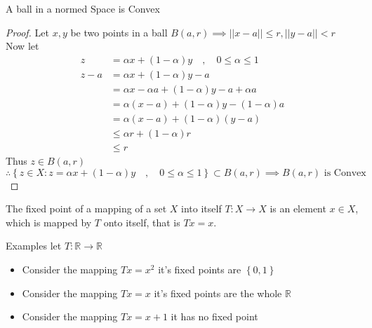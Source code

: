 \begin{definition}
\begin{center}
    \end{center}
\end{definition}
\begin{lemma}[]
    A ball in a normed Space is Convex
\end{lemma}
\begin{proof}[Proof]
    Let $x,y$ be two points in a ball $B(a,r) \implies ||x-a|| \leq r , ||y-a||<r$
    \\
    Now let 
    \begin{align*}
        z &= \alpha x + (1-\alpha)y \quad,\quad 0 \leq \alpha \leq 1
        \\
        z-a &= \alpha x + (1-\alpha)y-a
        \\
        &= \alpha x -\alpha a  + (1-\alpha)y-a + \alpha a 
        \\
        &= \alpha (x-a) + (1-\alpha)y-(1-\alpha)a
        \\
        &= \alpha (x-a) + (1-\alpha)(y-a)
        \\
        &\leq \alpha r + (1-\alpha)r
        \\
        &\leq r
    \end{align*}
    Thus $z \in B(a,r)$
    \[
        \therefore \left\{ z \in X : z = \alpha x + (1-\alpha)y \quad,\quad 0 \leq \alpha \leq 1 \right\} \subset B(a,r) \implies \text{$B(a,r)$ is Convex}
    \]
\end{proof}
\begin{definition}
    The fixed point of a mapping of a set $X$ into itself $T:X \to X$
    is an element $x \in X$, which is mapped by $T$ onto itself, that is $Tx=x$.
    
    Examples let $ T:\mathbb{R} \to \mathbb{R}$
    \begin{itemize}
        \item Consider the mapping $Tx = x^2$ it's fixed points are $\left\{ 0,1 \right\}$
        \item Consider the mapping $Tx = x$ it's fixed points are the whole $\mathbb{R}$ 
        \item Consider the mapping $Tx = x+1$ it has no fixed point
    \end{itemize}
\end{definition}

